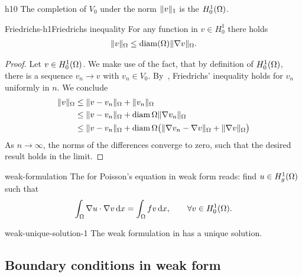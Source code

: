 \begin{Definition}{h10}
  The completion of $V_0$ under the norm $\lVert v\rVert_1$ is the
   $H^1_0(\Omega)$.
\end{Definition}

\begin{Lemma*}{Friedrichs-h1}{Friedrichs inequality}
  For any function in $v\in H^1_0$ there holds
  \begin{gather}
      \lVert v\rVert_{\Omega}
      \le \operatorname{diam}(\Omega) \lVert\nabla v\rVert_{\Omega}.
  \end{gather}
\end{Lemma*}

\begin{proof}
  Let $v\in H^1_0(\Omega)$.  We make use of the fact, that by
  definition of $H^1_0(\Omega)$, there is a sequence $v_n \to v$ with
  $v_n \in V_0$. By~,
  Friedrichs' inequality holds for $v_n$ uniformly in $n$. We conclude
  \begin{align*}
    \lVert v\rVert_\Omega &\le \lVert v - v_n\rVert_\Omega + \lVert v_n\rVert_\Omega \\
    & \le \lVert v - v_n\rVert_\Omega + \operatorname{diam}\Omega \lVert\nabla v_n\rVert_\Omega \\
    & \le \lVert v - v_n\rVert_\Omega + \operatorname{diam}\Omega
      \bigl(\lVert\nabla v_n - \nabla v\rVert_\Omega + \lVert\nabla v\rVert_\Omega\bigr)
  \end{align*}
  As $n\to\infty$, the norms of the differences converge to zero, such
  that the desired result holds in the limit.
\end{proof}

\begin{Definition}{weak-formulation}
  The  for Poisson's equation in weak form
  reads: find $u\in H^1_g(\Omega)$ such that
  \begin{gather}
    \int_{\Omega} \nabla u\cdot\nabla v \,\mathrm{d} x
    = \int_{\Omega} fv\,\mathrm{d} x, \qquad\forall v\in H^1_0(\Omega).
  \end{gather}
\end{Definition}

\begin{Theorem}{weak-unique-solution-1}
  The weak formulation in  has
  a unique solution.
\end{Theorem}

\subsection{Boundary conditions in weak form}

